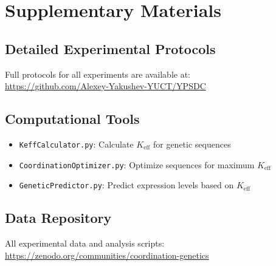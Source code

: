 \documentclass[12pt]{article}
\begin{document}
	\appendix
	\section{Supplementary Materials}
	
	\subsection{Detailed Experimental Protocols}
	
	Full protocols for all experiments are available at:\\
	\url{https://github.com/Alexey-Yakushev-YUCT/YPSDC}
	
	\subsection{Computational Tools}
	
	\begin{itemize}
		\item \texttt{KeffCalculator.py}: Calculate $K_{\text{eff}}$ for genetic sequences
		\item \texttt{CoordinationOptimizer.py}: Optimize sequences for maximum $K_{\text{eff}}$
		\item \texttt{GeneticPredictor.py}: Predict expression levels based on $K_{\text{eff}}$
	\end{itemize}
	
	\subsection{Data Repository}
	
	All experimental data and analysis scripts:\\
	\url{https://zenodo.org/communities/coordination-genetics}
	
\end{document}
